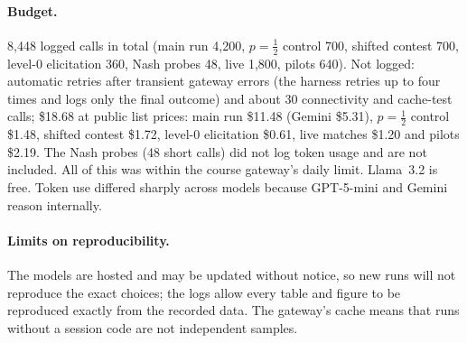 \documentclass[11pt]{article}
\begin{document}
\paragraph{Budget.} 8{,}448 logged calls in total (main run 4{,}200, $p=\tfrac12$ control 700, shifted contest 700, level-0 elicitation 360, Nash probes 48, live 1{,}800, pilots 640). Not logged: automatic retries after transient gateway errors (the harness retries up to four times and logs only the final outcome) and about 30 connectivity and cache-test calls; \$18.68 at public list prices: main run \$11.48 (Gemini \$5.31), $p=\tfrac12$ control \$1.48, shifted contest \$1.72, level-0 elicitation \$0.61, live matches \$1.20 and pilots \$2.19. The Nash probes (48 short calls) did not log token usage and are not included. All of this was within the course gateway's daily limit. Llama~3.2 is free. Token use differed sharply across models because GPT-5-mini and Gemini reason internally.

\paragraph{Limits on reproducibility.} The models are hosted and may be updated without notice, so new runs will not reproduce the exact choices; the logs allow every table and figure to be reproduced exactly from the recorded data. The gateway's cache means that runs without a session code are not independent samples.
\end{document}
